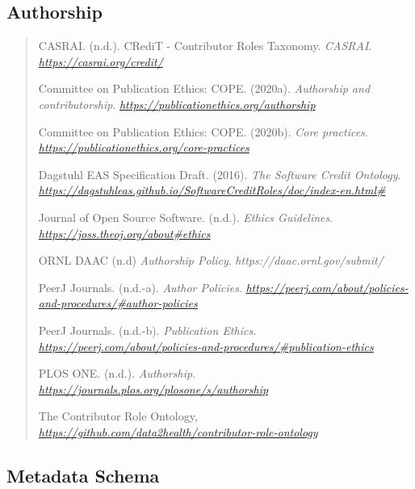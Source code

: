 \documentclass[]{article}
\begin{document}
\subsection{Authorship}\label{authorship}

\begin{quote}
CASRAI. (n.d.). CRediT - Contributor Roles Taxonomy. \emph{CASRAI}.
\href{https://casrai.org/credit/}{\emph{https://casrai.org/credit/}}

Committee on Publication Ethics: COPE. (2020a). \emph{Authorship and
contributorship}.
\href{https://publicationethics.org/authorship}{\emph{https://publicationethics.org/authorship}}

Committee on Publication Ethics: COPE. (2020b). \emph{Core practices}.
\href{https://publicationethics.org/core-practices}{\emph{https://publicationethics.org/core-practices}}

Dagstuhl EAS Specification Draft. (2016). \emph{The Software Credit
Ontology}.
\href{https://dagstuhleas.github.io/SoftwareCreditRoles/doc/index-en.html\#}{\emph{https://dagstuhleas.github.io/SoftwareCreditRoles/doc/index-en.html\#}}

Journal of Open Source Software. (n.d.). \emph{Ethics Guidelines}.
\href{https://joss.theoj.org/about\#ethics}{\emph{https://joss.theoj.org/about\#ethics}}

ORNL DAAC (n.d) \emph{Authorship Policy}.
\emph{https://daac.ornl.gov/submit/}

PeerJ Journals. (n.d.-a). \emph{Author Policies}.
\href{https://peerj.com/about/policies-and-procedures/\#author-policies}{\emph{https://peerj.com/about/policies-and-procedures/\#author-policies}}

PeerJ Journals. (n.d.-b). \emph{Publication Ethics}.
\href{https://peerj.com/about/policies-and-procedures/\#publication-ethics}{\emph{https://peerj.com/about/policies-and-procedures/\#publication-ethics}}

PLOS ONE. (n.d.). \emph{Authorship}.
\href{https://journals.plos.org/plosone/s/authorship}{\emph{https://journals.plos.org/plosone/s/authorship}}

The Contributor Role Ontology,
\href{https://github.com/data2health/contributor-role-ontology}{\emph{https://github.com/data2health/contributor-role-ontology}}
\end{quote}

\subsection{Metadata Schema}\label{metadata-schema}
\end{document}
